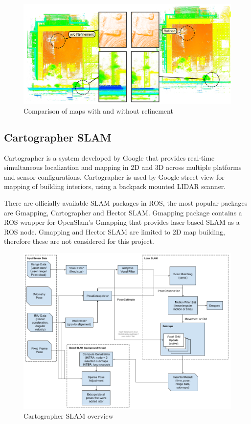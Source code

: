 \begin{figure}[!ht]
    \centering
    \includegraphics[width=150mm, keepaspectratio]{figures/3d_slam_example.png}
    \caption{Comparison of maps with and without refinement\cite{droeschel2018efficient}} 
    \label{fig:3d_lidar_mapping_example}
\end{figure}


\subsection{Cartographer SLAM}
Cartographer is a system developed by Google that provides real-time simultaneous localization and mapping
in 2D and 3D across multiple platforms and sensor configurations. Cartographer is used by Google street view
for mapping of building interiors, using a backpack mounted LIDAR scanner.

There are officially available SLAM packages in ROS, the most popular packages are Gmapping, Cartographer and Hector SLAM.
Gmapping package contains a ROS wrapper for OpenSlam's Gmapping that provides laser based SLAM as a ROS node. 
Gmapping and Hector SLAM are limited to 2D map building, therefore these are not considered for this project.

\begin{figure}[!ht]
    \centering
	\includegraphics[width=140mm, keepaspectratio]{figures/cartographer_slam.png}
    \caption{Cartographer SLAM overview\cite{CartographerDocumentation}}
    \label{fig:cartographer_slam_overview}
\end{figure}



